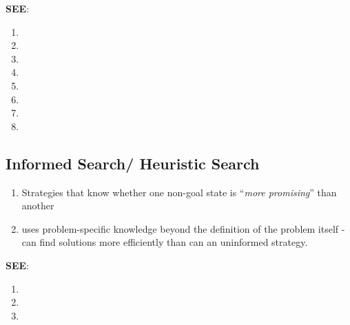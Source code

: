 \vspace{0.3cm}
\textbf{SEE}:
\begin{enumerate}
    \item {}
    \item {}
    \item {}
    \item {}
    \item {}
    \item {}
    \item {}
    \item {}
\end{enumerate}




\subsection{Informed Search/ Heuristic Search}

\begin{enumerate}
    \item Strategies that know whether one non-goal state is “\textit{more promising}” than another 
    \hfill \cite{ai/book/Artificial-Intelligence-A-Modern-Approach/Russell-Norvig}

    \item uses problem-specific knowledge beyond the definition of the problem itself - can find solutions more efficiently than can an uninformed strategy.
    \hfill \cite{ai/book/Artificial-Intelligence-A-Modern-Approach/Russell-Norvig}

    
\end{enumerate}


\vspace{0.3cm}
\textbf{SEE}:
\begin{enumerate}
    \item {}
    \item {}
    \item {}
\end{enumerate}











